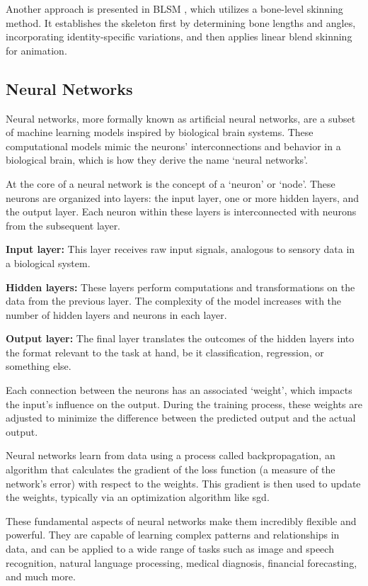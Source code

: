 Another approach is presented in BLSM \cite{doi:10.1007/978-3-030-58558-7_1},
which utilizes a bone-level skinning method. It establishes the skeleton first
by determining bone lengths and angles, incorporating identity-specific
variations, and then applies linear blend skinning for animation.

\subsection{Neural Networks}

Neural networks, more formally known as artificial neural networks, are a
subset of machine learning models inspired by biological brain systems. These
computational models mimic the neurons' interconnections and behavior in a
biological brain, which is how they derive the name `neural networks'.

At the core of a neural network is the concept of a `neuron' or `node'. These
neurons are organized into layers: the input layer, one or more hidden layers,
and the output layer. Each neuron within these layers is interconnected with
neurons from the subsequent layer.

\textbf{Input layer:} This layer receives raw input signals,
analogous to sensory data in a biological system.

\textbf{Hidden layers:} These layers perform computations and transformations
on the data from the previous layer. The complexity of the model increases with
the number of hidden layers and neurons in each layer.

\textbf{Output layer:} The final layer translates the outcomes of the hidden
layers into the format relevant to the task at hand, be it classification,
regression, or something else.

Each connection between the neurons has an associated `weight', which impacts
the input's influence on the output. During the training process, these weights
are adjusted to minimize the difference between the predicted output and the
actual output.

Neural networks learn from data using a process called backpropagation, an
algorithm that calculates the gradient of the loss function (a measure of the
network's error) with respect to the weights. This gradient is then used to
update the weights, typically via an optimization algorithm like \gls{sgd}.

These fundamental aspects of neural networks make them incredibly flexible and
powerful. They are capable of learning complex patterns and relationships in
data, and can be applied to a wide range of tasks such as image and speech
recognition, natural language processing, medical diagnosis, financial
forecasting, and much more.

